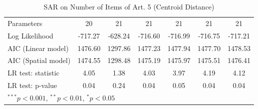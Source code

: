 \begin{table}[!h]
\begin{center}
\begin{tabular}{l c c c c c c }
Parameters              & 20           & 21           & 21           & 21           & 21           & 21           \\
Log Likelihood          & -717.27      & -628.24      & -716.60      & -716.99      & -716.75      & -717.21      \\
AIC (Linear model)      & 1476.60      & 1297.86      & 1477.23      & 1477.94      & 1477.70      & 1478.53      \\
AIC (Spatial model)     & 1474.55      & 1298.48      & 1475.19      & 1475.97      & 1475.51      & 1476.41      \\
LR test: statistic      & 4.05         & 1.38         & 4.03         & 3.97         & 4.19         & 4.12         \\
LR test: p-value        & 0.04         & 0.24         & 0.04         & 0.05         & 0.04         & 0.04         \\
\bottomrule
\multicolumn{7}{l}{\scriptsize{$^{***}p<0.001$, $^{**}p<0.01$, $^*p<0.05$}}
\end{tabular}
\caption{SAR on Number of Items of Art. 5 (Centroid Distance)}
\label{table:coefficients}
\end{center}
\end{table}
